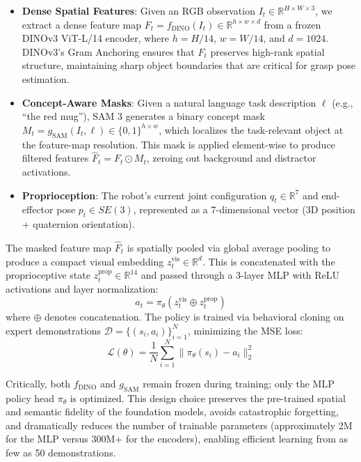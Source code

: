 \documentclass[conference]{IEEEtran}
\begin{document}
\begin{itemize}
    \item \textbf{Dense Spatial Features}: Given an RGB observation $I_t \in \mathbb{R}^{H \times W \times 3}$, we extract a dense feature map $F_t = f_{\text{DINO}}(I_t) \in \mathbb{R}^{h \times w \times d}$ from a frozen DINOv3 ViT-L/14 encoder, where $h = H/14$, $w = W/14$, and $d = 1024$. DINOv3's Gram Anchoring ensures that $F_t$ preserves high-rank spatial structure, maintaining sharp object boundaries that are critical for grasp pose estimation.
    \item \textbf{Concept-Aware Masks}: Given a natural language task description $\ell$ (e.g., ``the red mug''), SAM 3 generates a binary concept mask $M_t = g_{\text{SAM}}(I_t, \ell) \in \{0, 1\}^{h \times w}$, which localizes the task-relevant object at the feature-map resolution. This mask is applied element-wise to produce filtered features $\hat{F}_t = F_t \odot M_t$, zeroing out background and distractor activations.
    \item \textbf{Proprioception}: The robot's current joint configuration $q_t \in \mathbb{R}^{7}$ and end-effector pose $p_t \in SE(3)$, represented as a 7-dimensional vector (3D position + quaternion orientation).
\end{itemize}

The masked feature map $\hat{F}_t$ is spatially pooled via global average pooling to produce a compact visual embedding $z_t^{\text{vis}} \in \mathbb{R}^d$. This is concatenated with the proprioceptive state $z_t^{\text{prop}} \in \mathbb{R}^{14}$ and passed through a 3-layer MLP with ReLU activations and layer normalization:
\begin{equation}
    a_t = \pi_\theta(z_t^{\text{vis}} \oplus z_t^{\text{prop}})
\end{equation}
where $\oplus$ denotes concatenation. The policy is trained via behavioral cloning on expert demonstrations $\mathcal{D} = \{(s_i, a_i)\}_{i=1}^{N}$, minimizing the MSE loss:
\begin{equation}
    \mathcal{L}(\theta) = \frac{1}{N} \sum_{i=1}^{N} \| \pi_\theta(s_i) - a_i \|_2^2
\end{equation}

Critically, both $f_{\text{DINO}}$ and $g_{\text{SAM}}$ remain frozen during training; only the MLP policy head $\pi_\theta$ is optimized. This design choice preserves the pre-trained spatial and semantic fidelity of the foundation models, avoids catastrophic forgetting, and dramatically reduces the number of trainable parameters (approximately 2M for the MLP versus 300M+ for the encoders), enabling efficient learning from as few as 50 demonstrations.
\end{document}
